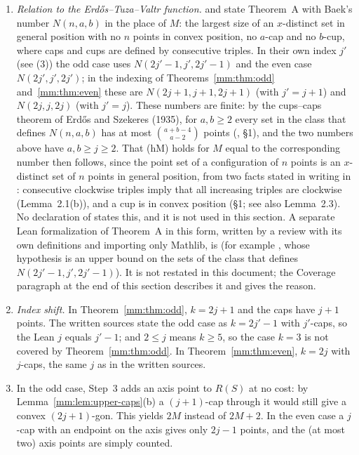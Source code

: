 \begin{remark}
\begin{enumerate}[label=(\arabic*)]
  and~\ref{mm:thm:even}; the Lean proofs of Theorem~\ref{mm:thm:small} do not take this route.
\item \emph{Relation to the Erd\H{o}s--Tuza--Valtr function.}  and
   state Theorem~A with Baek's number $N(n,a,b)$ in the place of $M$: the
  largest size of an $x$-distinct set in general position with no $n$ points in convex position, no
  $a$-cap and no $b$-cup, where caps and cups are defined by consecutive triples. In their own index $j'$
  (see (3)) the odd case uses $N(2j'-1,j',2j'-1)$ and the even case $N(2j',j',2j')$; in the indexing of
  Theorems~\ref{mm:thm:odd} and~\ref{mm:thm:even} these are $N(2j+1,j+1,2j+1)$ (with $j'=j+1$) and
  $N(2j,j,2j)$ (with $j'=j$). These numbers are finite: by the cups--caps theorem of Erd\H{o}s and
  Szekeres (1935), for $a,b\ge2$ every set in the class that defines $N(n,a,b)$ has at most
  $\binom{a+b-4}{a-2}$ points (, \S1), and the two numbers above have
  $a,b\ge j\ge2$.
  That (hM) holds for $M$ equal to the corresponding number then follows, since the point set of a
  configuration of $n$ points is an $x$-distinct set of $n$ points in general position, from two facts
  stated in writing in : consecutive clockwise triples imply that all
  increasing triples are clockwise (Lemma~2.1(b)), and a cup is in convex position (\S1; see also
  Lemma~2.3). No declaration of  states this, and it is not used in this section. A
  separate Lean formalization of Theorem~A in this form, written by a review with its own definitions
  and importing only Mathlib, is
   (for example , whose hypothesis is an
  upper bound on the sets of the class that defines $N(2j'-1,j',2j'-1)$). It is not restated in this
  document; the Coverage paragraph at the end of this section describes it and gives the reason.
\item \emph{Index shift.} In Theorem~\ref{mm:thm:odd}, $k=2j+1$ and the caps have $j+1$ points. The
  written sources state the odd case as $k=2j'-1$ with $j'$-caps, so the Lean $j$ equals $j'-1$; and
  $2\le j$ means $k\ge5$, so the case $k=3$ is not covered by Theorem~\ref{mm:thm:odd}. In
  Theorem~\ref{mm:thm:even}, $k=2j$ with $j$-caps, the same $j$ as in the written sources.
\item In the odd case, Step~3 adds an axis point to $R(S)$ at no cost: by
  Lemma~\ref{mm:lem:upper-caps}(b) a $(j+1)$-cap through it would still give a convex $(2j+1)$-gon. This
  yields $2M$ instead of $2M+2$. In the even case a $j$-cap with an endpoint on the axis gives only
  $2j-1$ points, and the (at most two) axis points are simply counted.
\end{enumerate}
\end{remark}

